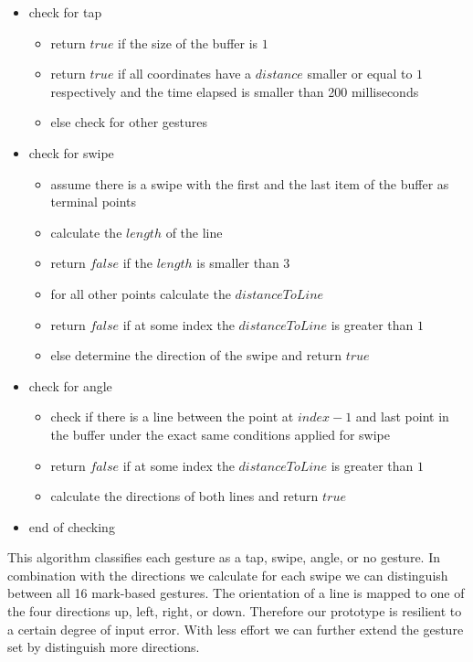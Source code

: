 \begin{tt}
\begin{itemize}
\item check for tap
	\begin{itemize}
		\item return $true$ if the size of the buffer is $1$ 
		\item return $true$ if all coordinates have a $distance$ smaller or equal to $1$ respectively and the time elapsed is smaller than 200 milliseconds
		\item else check for other gestures
	\end{itemize}
\item check for swipe
	\begin{itemize}
	\item assume there is a swipe with the first and the last item of the buffer as terminal points
	\item calculate the $length$ of the line
	\item return $false$ if the $length$ is smaller than $3$
	\item for all other points calculate the $distanceToLine$ 
	\item return $false$ if at some index the $distanceToLine$ is greater than $1$
	\item else determine the direction of the swipe and return $true$
	\end{itemize}
\item check for angle
	\begin{itemize}
	\item check if there is a line between the point at $ index - 1$ and last point in the buffer under the exact same conditions applied for swipe
	\item return $false$ if at some index the $distanceToLine$ is greater than $1$
	\item calculate the directions of both lines and return $true$
	\end{itemize}
\item end of checking 
\end{itemize}
\end{tt}
This algorithm classifies each gesture as a tap, swipe, angle, or no gesture. In combination with the directions we calculate for each swipe we can distinguish between all 16 mark-based gestures. The orientation of a line is mapped to one of the four directions up, left, right, or down. Therefore our prototype is resilient to a certain degree of input error. With less effort we can further extend the gesture set by distinguish more directions. 
